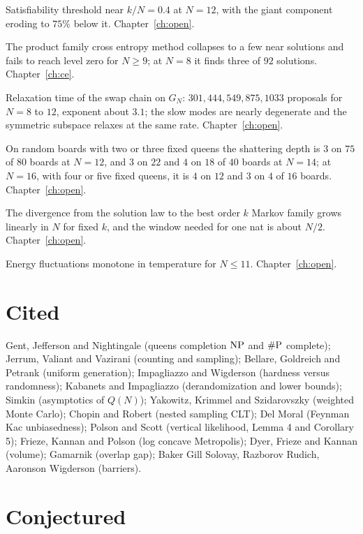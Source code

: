 \begin{description}[style=nextline]
\item[Random completion model] Satisfiability threshold near $k/N = 0.4$ at $N = 12$, with the giant component eroding to $75\%$ below it. Chapter~\ref{ch:open}.
\item[Cross entropy collapse] The product family cross entropy method collapses to a few near solutions and fails to reach level zero for $N \ge 9$; at $N = 8$ it finds three of $92$ solutions. Chapter~\ref{ch:ce}.
\item[Spectral gap] Relaxation time of the swap chain on $G_N$: $301, 444, 549, 875, 1033$ proposals for $N = 8$ to $12$, exponent about $3.1$; the slow modes are nearly degenerate and the symmetric subspace relaxes at the same rate. Chapter~\ref{ch:open}.
\item[Depth growth] On random boards with two or three fixed queens the shattering depth is $3$ on $75$ of $80$ boards at $N = 12$, and $3$ on $22$ and $4$ on $18$ of $40$ boards at $N = 14$; at $N = 16$, with four or five fixed queens, it is $4$ on $12$ and $3$ on $4$ of $16$ boards. Chapter~\ref{ch:open}.
\item[Window divergence] The divergence from the solution law to the best order $k$ Markov family grows linearly in $N$ for fixed $k$, and the window needed for one nat is about $N/2$. Chapter~\ref{ch:open}.
\item[No thermal transition] Energy fluctuations monotone in temperature for $N \le 11$. Chapter~\ref{ch:open}.
\end{description}

\section*{Cited}

Gent, Jefferson and Nightingale (queens completion $\mathrm{NP}$ and $\#\mathrm{P}$ complete); Jerrum, Valiant and Vazirani (counting and sampling); Bellare, Goldreich and Petrank (uniform generation); Impagliazzo and Wigderson (hardness versus randomness); Kabanets and Impagliazzo (derandomization and lower bounds); Simkin (asymptotics of $Q(N)$); Yakowitz, Krimmel and Szidarovszky (weighted Monte Carlo); Chopin and Robert (nested sampling CLT); Del Moral (Feynman Kac unbiasedness); Polson and Scott (vertical likelihood, Lemma 4 and Corollary 5); Frieze, Kannan and Polson (log concave Metropolis); Dyer, Frieze and Kannan (volume); Gamarnik (overlap gap); Baker Gill Solovay, Razborov Rudich, Aaronson Wigderson (barriers).

\section*{Conjectured}

